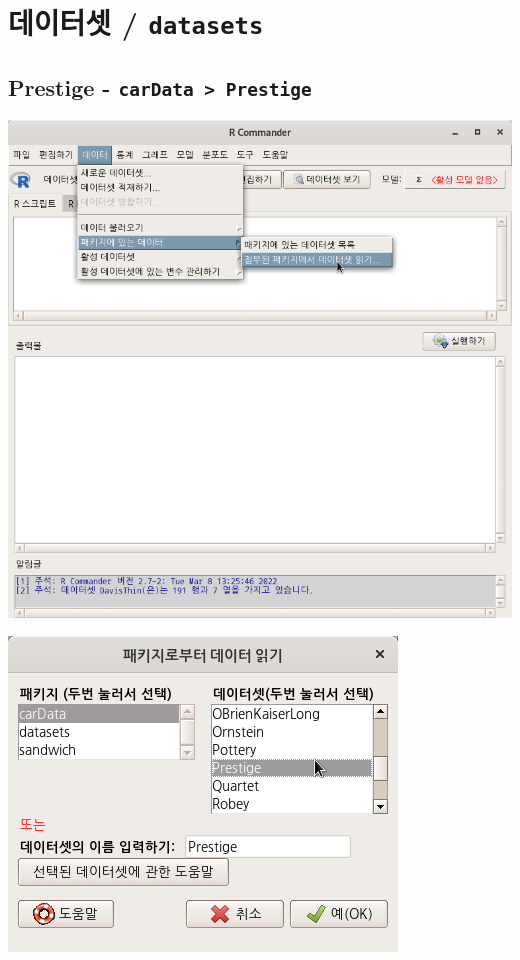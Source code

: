 \documentclass[
]{book}
\begin{document}
\hypertarget{uxb370uxc774uxd130uxc14b-datasets}{%
\chapter{\texorpdfstring{데이터셋 / \texttt{datasets}}{데이터셋 / datasets}}\label{uxb370uxc774uxd130uxc14b-datasets}}

\hypertarget{prestige---cardata-prestige}{%
\section{\texorpdfstring{Prestige - \texttt{carData\ \textgreater{}\ Prestige}}{Prestige - carData \textgreater{} Prestige}}\label{prestige---cardata-prestige}}

\includegraphics{fig/dataset-prestiage-01.png}

\includegraphics{fig/dataset-prestiage-02.png}
\end{document}
